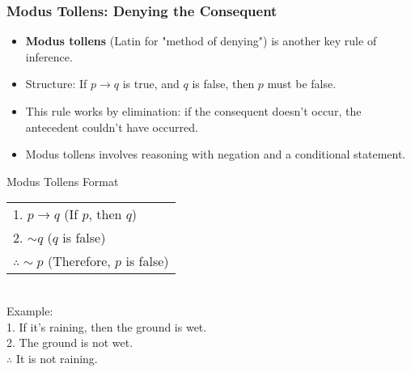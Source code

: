 \documentclass{beamer}
\begin{document}
                            \begin{frame}
                            \frametitle{Modus Tollens: Denying the Consequent}
                            \begin{itemize}
                                \item \textbf{Modus tollens} (Latin for "method of denying") is another key rule of inference.
                                \item Structure: If $p \rightarrow q$ is true, and $q$ is false, then $p$ must be false.
                                \item This rule works by elimination: if the consequent doesn't occur, the antecedent couldn't have occurred.
                                \item Modus tollens involves reasoning with negation and a conditional statement.
                            \end{itemize}
                            
                            \begin{block}{Modus Tollens Format}
                                \scriptsize
                            \begin{tabular}{l}
                            1. $p \rightarrow q$ \hspace{1cm} (If $p$, then $q$) \\
                            2. $\sim q$ \hspace{1.7cm} ($q$ is false) \\
                            \hline
                            $\therefore \sim p$ \hspace{1.4cm} (Therefore, $p$ is false)
                            \end{tabular}\\[0.3cm]
                            Example:\\
                            1. If it's raining, then the ground is wet.\\
                            2. The ground is not wet.\\
                            $\therefore$ It is not raining.
                            \end{block}
                            \end{frame}
\end{document}
